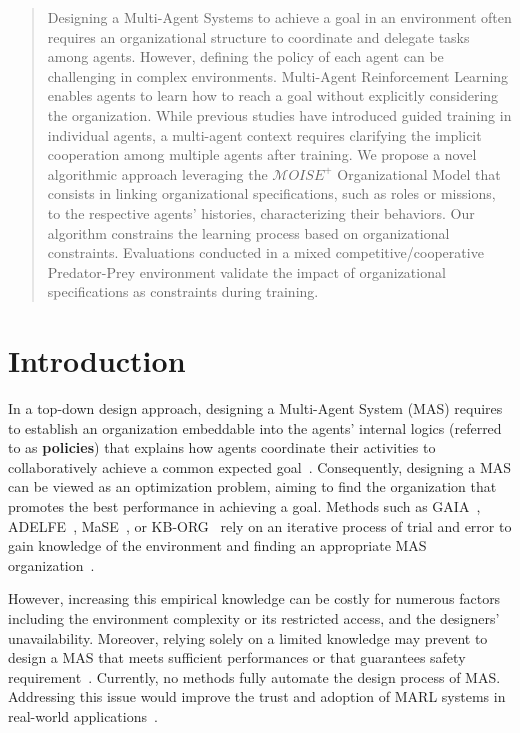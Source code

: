 \documentclass[runningheads]{llncs}
\theoremstyle{freethm}
\theoremstyle{proofoutline}
\begin{document}
\begin{abstract}

    Designing a Multi-Agent Systems to achieve a goal in an environment often requires an organizational structure to coordinate and delegate tasks among agents. However, defining the policy of each agent can be challenging in complex environments. Multi-Agent Reinforcement Learning enables agents to learn how to reach a goal without explicitly considering the organization.
    While previous studies have introduced guided training in individual agents, a multi-agent context requires clarifying the implicit cooperation among multiple agents after training. We propose a novel algorithmic approach leveraging the $\mathcal{M}OISE^+$ Organizational Model that consists in linking organizational specifications, such as roles or missions, to the respective agents' histories, characterizing their behaviors. Our algorithm constrains the learning process based on organizational constraints. Evaluations conducted in a mixed competitive/cooperative Predator-Prey environment validate the impact of organizational specifications as constraints during training.

\end{abstract}


\section{Introduction}

In a top-down design approach, designing a Multi-Agent System (MAS) requires to establish an organization embeddable into the agents' internal logics (referred to as \textbf{policies}) that explains how agents coordinate their activities to collaboratively achieve a common expected goal~\cite{Picard2009}.
%
Consequently, designing a MAS can be viewed as an optimization problem, aiming to find the organization that promotes the best performance in achieving a goal. Methods such as GAIA~\cite{Wooldridge2000,Cernuzzi2014}, ADELFE~\cite{Mefteh2015}, MaSE~\cite{Deloach2001}, or KB-ORG~\cite{Sims2008} rely on an iterative process of trial and error to gain knowledge of the environment and finding an appropriate MAS organization~\cite{Sims2008}.

However, increasing this empirical knowledge can be costly for numerous factors including the environment complexity or its restricted access, and the designers' unavailability. Moreover, relying solely on a limited knowledge may prevent to design a MAS that meets sufficient performances or that guarantees safety requirement~\cite{Mefteh2013}. Currently, no methods fully automate the design process of MAS. Addressing this issue would improve the trust and adoption of MARL systems in real-world applications~\cite{kok2006collaborative,omidshafiei2019learning}.
\end{document}
